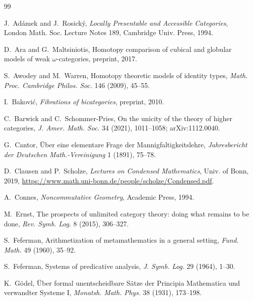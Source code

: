 \documentclass[11pt]{article}
\theoremstyle{plain}
\theoremstyle{definition}
\begin{document}
\begin{thebibliography}{99}

J.~Ad\'amek and J.~Rosick\'y,
\newblock \emph{Locally Presentable and Accessible Categories},
\newblock London Math. Soc. Lecture Notes 189, Cambridge Univ. Press, 1994.

D.~Ara and G.~Maltsiniotis,
\newblock Homotopy comparison of cubical and globular models of weak $\omega$-categories,
\newblock preprint, 2017.

S.~Awodey and M.~Warren,
\newblock Homotopy theoretic models of identity types,
\newblock \emph{Math. Proc. Cambridge Philos. Soc.} 146 (2009), 45--55.

I.~Bakovi\'c,
\newblock \emph{Fibrations of bicategories},
\newblock preprint, 2010.

C.~Barwick and C.~Schommer-Pries,
\newblock On the unicity of the theory of higher categories,
\newblock \emph{J. Amer. Math. Soc.} 34 (2021), 1011--1058; arXiv:1112.0040.

G.~Cantor,
\newblock \"Uber eine elementare Frage der Mannigfaltigkeitslehre,
\newblock \emph{Jahresbericht der Deutschen Math.-Vereinigung} 1 (1891), 75--78.

D.~Clausen and P.~Scholze,
\newblock \emph{Lectures on Condensed Mathematics},
\newblock Univ. of Bonn, 2019,
\newblock \url{https://www.math.uni-bonn.de/people/scholze/Condensed.pdf}.

A.~Connes,
\newblock \emph{Noncommutative Geometry},
\newblock Academic Press, 1994.

M.~Ernst,
\newblock The prospects of unlimited category theory: doing what remains to be done,
\newblock \emph{Rev. Symb. Log.} 8 (2015), 306--327.

S.~Feferman,
\newblock Arithmetization of metamathematics in a general setting,
\newblock \emph{Fund. Math.} 49 (1960), 35--92.

S.~Feferman,
\newblock Systems of predicative analysis,
\newblock \emph{J. Symb. Log.} 29 (1964), 1--30.

K.~G\"odel,
\newblock \"Uber formal unentscheidbare S\"atze der Principia Mathematica und verwandter Systeme I,
\newblock \emph{Monatsh. Math. Phys.} 38 (1931), 173--198.


\end{thebibliography}
\end{document}

